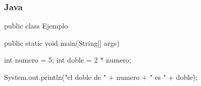
\begin{frame}[fragile]
    \frametitle{Java}
    
    \begin{java}
public class Ejemplo {
    public static void main(String[] args) {
        int numero = 5;
        int doble = 2 * numero;
        
        System.out.println("el doble de " + numero +
                         " es " + doble);
    }
}
    \end{java}
\end{frame}